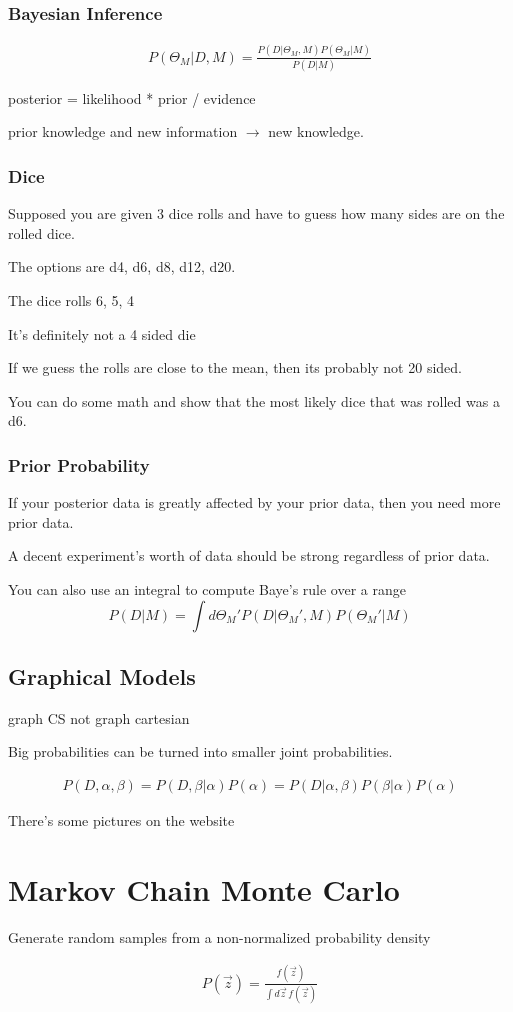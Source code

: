\documentclass[fleqn]{report}
\newcommand{\equations} [1] {
\begin{gather*}
#1
\end{gather*}
}
\begin{document}
\subsection{Bayesian Inference}
\equations{
    P(\Theta_M | D, M)
    =
    \frac{P(D | \Theta_M, M) P(\Theta_M | M)}
    {P( D | M)}
}
posterior = likelihood * prior / evidence

prior knowledge and new information $\rightarrow$ new knowledge. 

\subsection{Dice}
Supposed you are given 3 dice rolls and have to guess how 
many sides are on the rolled dice.

The options are d4, d6, d8, d12, d20. 

The dice rolls 6, 5, 4

It's definitely not a 4 sided die 

If we guess the rolls are close to the mean, then its probably not 20 sided. 

You can do some math and show that the most likely dice that was rolled was 
a d6. 

\subsection{Prior Probability}
If your posterior data is greatly affected by your prior data, then you need more 
prior data. 

A decent experiment's worth of data should be strong regardless of prior data. 

You can also use an integral to compute Baye's rule over a range 
\[
P(D | M)
=
\int d \Theta_M' P(D | \Theta_M' , M)  P(\Theta_M' | M)
\]

\section{Graphical Models}
graph CS not graph cartesian 

Big probabilities can be turned into smaller joint probabilities. 
\equations{
    P(D, \alpha, \beta)
    =
P(D, \beta | \alpha ) P(\alpha )
=
    P(D | \alpha, \beta)
    P( \beta | \alpha)
    P(\alpha)
}

There's some pictures on the website 

\chapter{Markov Chain Monte Carlo}
Generate random samples from a non-normalized probability density 
\equations{
P(\vec z) = 
\frac{f(\vec z)}{\int d \vec z \, f(\vec z)}
}
\end{document}
